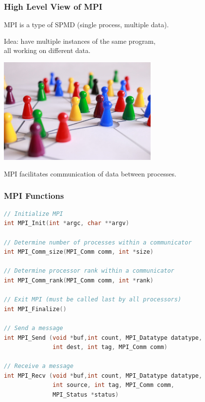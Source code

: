 \begin{frame}
  \frametitle{High Level View of MPI}

  

    MPI is a type of SPMD (single process, multiple data).

    Idea: have multiple instances of the same program, \\ all working on
      different data.
      
    \begin{center}
	\includegraphics[width=0.6\textwidth]{images/networked.jpeg}
	\end{center}

    MPI facilitates communication of data between processes.
    

  
\end{frame}


\begin{frame}[fragile]
  \frametitle{MPI Functions}
  

  \begin{lstlisting}[language=C++]
// Initialize MPI
int MPI_Init(int *argc, char **argv)

// Determine number of processes within a communicator
int MPI_Comm_size(MPI_Comm comm, int *size)

// Determine processor rank within a communicator
int MPI_Comm_rank(MPI_Comm comm, int *rank)

// Exit MPI (must be called last by all processors)
int MPI_Finalize()

// Send a message
int MPI_Send (void *buf,int count, MPI_Datatype datatype,
              int dest, int tag, MPI_Comm comm)

// Receive a message
int MPI_Recv (void *buf,int count, MPI_Datatype datatype,
              int source, int tag, MPI_Comm comm,
              MPI_Status *status)
    
  \end{lstlisting}
  
\end{frame}

